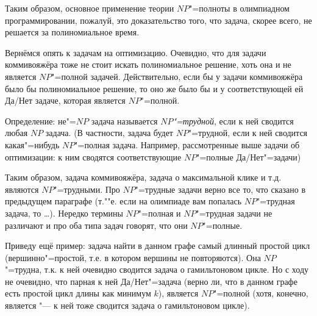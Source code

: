 {

Таким образом, основное применение теории $NP$"=полноты в олимпиадном программировании, пожалуй, это доказательство того, что 
задача, скорее всего, не решается за полиномиальное время.

 Вернёмся опять к задачам на оптимизацию. 
Очевидно, что для задачи
коммивояжёра тоже не стоит искать полиномиальное решение, хоть она и не является $NP$"=полной 
задачей. Действительно, если бы у задачи коммивояжёра было бы полиномиальное решение, то оно 
же было бы и у соответствующей ей Да/Нет задаче, которая является $NP$"=полной.

Определение: не"=$NP$ задача называется \textit{$NP$"=трудной}, если к 
ней сводится любая $NP$ задача. (В частности, задача будет $NP$"=трудной, если 
к ней сводится какая"=нибудь $NP$"=полная задача. Например, рассмотренные выше 
задачи об оптимизации: к ним сводятся соответствующие $NP$"=полные Да/Нет"=задачи)

Таким образом, задача коммивояжёра, задача о максимальной клике и т.д. являются $NP$"=трудными. Про 
$NP$"=трудные задачи верно все то, что сказано в предыдущем параграфе (т.""е. если на 
олимпиаде вам попалась $NP$"=трудная задача, то \dots). Нередко термины $NP$"=полная и 
$NP$"=трудная задачи не различают и про оба типа задач говорят, что они $NP$"=полные.

Приведу ещё пример: задача найти в данном графе самый длинный простой цикл 
(вершинно"=простой, т.е. в котором вершины не повторяются). Она $NP$"=трудна, 
т.к. к ней очевидно сводится задача о гамильтоновом цикле. Но с ходу не 
очевидно, что парная к ней Да/Нет"=задача (верно ли, что в данном графе есть 
простой цикл длины как минимум $k$), является $NP$"=полной (хотя, конечно, является "--- к ней тоже сводится задача о гамильтоновом цикле).


}
